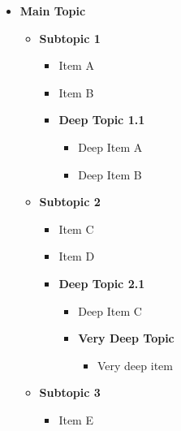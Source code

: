 \begin{center}
\end{center}

\vspace{0.3cm}
\begin{itemize}
\item \textbf{Main Topic}
\begin{itemize}
\item \textbf{Subtopic 1}
\begin{itemize}
\item Item A
\item Item B
\end{itemize}
\begin{itemize}
\item \textbf{Deep Topic 1.1}
\begin{itemize}
\item Deep Item A
\item Deep Item B
\end{itemize}
\end{itemize}
\end{itemize}
\begin{itemize}
\item \textbf{Subtopic 2}
\begin{itemize}
\item Item C
\item Item D
\end{itemize}
\begin{itemize}
\item \textbf{Deep Topic 2.1}
\begin{itemize}
\item Deep Item C
\end{itemize}
\begin{itemize}
\item \textbf{Very Deep Topic}
\begin{itemize}
\item Very deep item
\end{itemize}
\end{itemize}
\end{itemize}
\end{itemize}
\begin{itemize}
\item \textbf{Subtopic 3}
\begin{itemize}
\item Item E
\end{itemize}
\end{itemize}
\end{itemize}